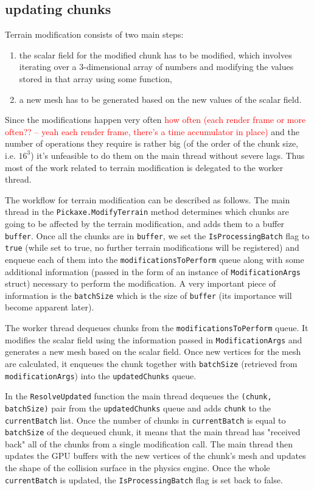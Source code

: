\subsection{updating chunks}
Terrain modification consists of two main steps:
\begin{enumerate}
    \item the scalar field for the modified chunk has to be modified, which involves iterating over a 3-dimensional array of numbers and modifying the values stored in that array using some function,
    \item a new mesh has to be generated based on the new values of the scalar field.
\end{enumerate}
Since the modifications happen very often \textcolor{red}{how often (each render frame or more often?? -- yeah each render frame, there's a time accumulator in place)} and the number of operations they require is rather big (of the order of the chunk size, i.e. $16^3$) it's unfeasible to do them on the main thread without severe lags.
Thus most of the work related to terrain modification is delegated to the worker thread.

The workflow for terrain modification can be described as follows.
The main thread in the \texttt{Pickaxe.ModifyTerrain} method determines which chunks are going to be affected by the terrain modification, and adds them to a buffer \texttt{buffer}.
Once all the chunks are in \texttt{buffer}, we set the \texttt{IsProcessingBatch} flag to \texttt{true} (while set to true, no further terrain modifications will be registered) and enqueue each of them into the \texttt{modificationsToPerform} queue along with some additional information (passed in the form of an instance of \texttt{ModificationArgs} struct) necessary to perform the modification.
A very important piece of information is the \texttt{batchSize} which is the size of \texttt{buffer} (its importance will become apparent later).

The worker thread dequeues chunks from the \texttt{modificationsToPerform} queue.
It modifies the scalar field using the information passed in \texttt{ModificationArgs} and generates a new mesh based on the scalar field.
Once new vertices for the mesh are calculated, it enqueues the chunk together with \texttt{batchSize} (retrieved from \texttt{modificationArgs}) into the \texttt{updatedChunks} queue.

In the \texttt{ResolveUpdated} function the main thread dequeues the \texttt{(chunk, batchSize)} pair from the \texttt{updatedChunks} queue and adds \texttt{chunk} to the \texttt{currentBatch} list.
Once the number of chunks in \texttt{currentBatch} is equal to \texttt{batchSize} of the dequeued chunk, it means that the main thread has "received back" all of the chunks from a single modification call.
The main thread then updates the GPU buffers with the new vertices of the chunk's mesh and updates the shape of the collision surface in the physics engine.
Once the whole \texttt{currentBatch} is updated, the \texttt{IsProcessingBatch} flag is set back to false.

